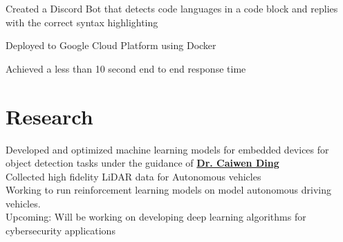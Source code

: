 \documentclass[]{resume-template}
\begin{document}
\begin{minipage}[t]{0.66\textwidth}
        \label{subsec:neatbot}
        \begin{tightemize}
            \item Created a Discord Bot that detects code languages in a code block and replies with the correct syntax highlighting
            \item Deployed to Google Cloud Platform using Docker
            \item Achieved a less than 10 second end to end response time
        \end{tightemize}




        \sectionsep{}



        \section{Research}\label{sec:research}
        \textbullet{} Developed and optimized machine learning models for embedded devices for object detection tasks under the guidance of \textbf{\href{https://caiwending.cse.uconn.edu/}{Dr. Caiwen Ding}} \\
        \textbullet{} Collected high fidelity LiDAR data for Autonomous vehicles \\
        \textbullet{} Working to run reinforcement learning models on model autonomous driving vehicles. \\
        \textbullet{} Upcoming: Will be working on developing deep learning algorithms for cybersecurity applications  
        \sectionsep



\end{minipage}
\end{document}
